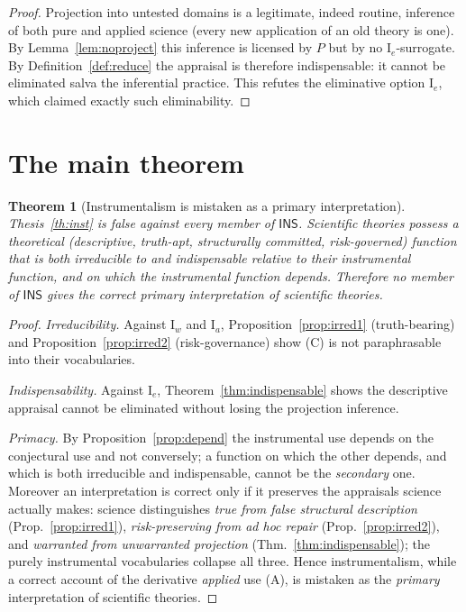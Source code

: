 \documentclass{amsart}
\theoremstyle{definition}
\theoremstyle{plain}
\newtheorem{theorem}{Theorem}
\begin{document}
\begin{proof}
Projection into untested domains is a legitimate, indeed routine, inference of
both pure and applied science (every new application of an old theory is one).
By Lemma~\ref{lem:noproject} this inference is licensed by $P$ but by no
$\mathrm I_e$-surrogate. By Definition~\ref{def:reduce} the appraisal is
therefore indispensable: it cannot be eliminated salva the inferential
practice. This refutes the eliminative option $\mathrm I_e$, which claimed
exactly such eliminability.
\end{proof}

\section{The main theorem}

\begin{theorem}[Instrumentalism is mistaken as a primary
interpretation]\label{thm:main}
Thesis~\textup{\ref{th:inst}} is false against every member of $\mathsf{INS}$.
Scientific theories possess a theoretical (descriptive, truth-apt, structurally
committed, risk-governed) function that is both \emph{irreducible} to and
\emph{indispensable} relative to their instrumental function, and on which the
instrumental function depends. Therefore no member of $\mathsf{INS}$ gives the
correct primary interpretation of scientific theories.
\end{theorem}

\begin{proof}
\emph{Irreducibility.} Against $\mathrm I_w$ and $\mathrm I_a$,
Proposition~\ref{prop:irred1} (truth-bearing) and
Proposition~\ref{prop:irred2} (risk-governance) show (C) is not paraphrasable
into their vocabularies.

\emph{Indispensability.} Against $\mathrm I_e$,
Theorem~\ref{thm:indispensable} shows the descriptive appraisal cannot be
eliminated without losing the projection inference.

\emph{Primacy.} By Proposition~\ref{prop:depend} the instrumental use depends on
the conjectural use and not conversely; a function on which the other depends,
and which is both irreducible and indispensable, cannot be the \emph{secondary}
one. Moreover an interpretation is correct only if it preserves the appraisals
science actually makes: science distinguishes \emph{true from false structural
description} (Prop.~\ref{prop:irred1}), \emph{risk-preserving from ad hoc
repair} (Prop.~\ref{prop:irred2}), and \emph{warranted from unwarranted
projection} (Thm.~\ref{thm:indispensable}); the purely instrumental
vocabularies collapse all three. Hence instrumentalism, while a correct account
of the derivative \emph{applied} use (A), is mistaken as the \emph{primary}
interpretation of scientific theories.
\end{proof}
\end{document}
